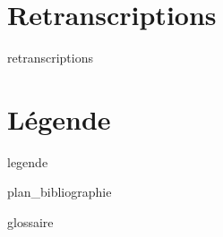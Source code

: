 \chapter{Retranscriptions}
\label{anx:retrans}
{retranscriptions}

\chapter{Légende}
\label{anx:topo_leg}
{legende}


\label{refs}
{plan_bibliographie}

\label{gloss}
{glossaire}


